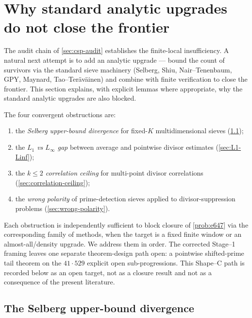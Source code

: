 
\section{Why standard analytic upgrades do not close the frontier}
\label{sec:obstructions}

The audit chain of \cref{sec:csp-audit} establishes the
finite-local insufficiency. A natural next attempt is to add an
analytic upgrade --- bound the count of survivors via the standard
sieve machinery (Selberg, Shiu, Nair--Tenenbaum, GPY, Maynard,
Tao--Ter\"av\"ainen) and combine with finite verification to close
the frontier. This section explains, with explicit lemmas where
appropriate, why the standard analytic upgrades are also blocked.

The four convergent obstructions are:

\begin{enumerate}[leftmargin=*, label=(\textbf{O\arabic*})]
\item the \emph{Selberg upper-bound divergence} for fixed-$K$
  multidimensional sieves (\cref{sec:selberg-divergence});
\item the \emph{$L_1$ vs $L_\infty$ gap} between average and pointwise
  divisor estimates (\cref{sec:L1-Linf});
\item the \emph{$k \le 2$ correlation ceiling} for multi-point
  divisor correlations (\cref{sec:correlation-ceiling});
\item the \emph{wrong polarity} of prime-detection sieves applied to
  divisor-suppression problems (\cref{sec:wrong-polarity}).
\end{enumerate}

Each obstruction is independently sufficient to block closure of
\cref{prob:e647} via the corresponding family of methods, when the
target is a fixed finite window or an almost-all/density upgrade. We
address them in order. The corrected Stage--1 framing leaves one
separate theorem-design path open: a pointwise shifted-prime tail
theorem on the $41 \cdot 529$ explicit open sub-progressions. This
Shape--C path is recorded below as an open target, not as a closure
result and not as a consequence of the present literature.

\subsection{The Selberg upper-bound divergence}
\label{sec:selberg-divergence}

